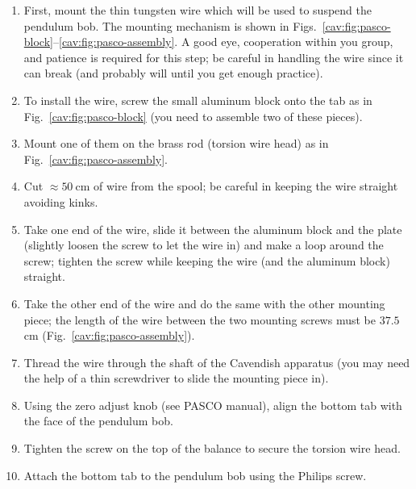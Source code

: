\begin{enumerate}
	\item First, mount the thin tungsten wire which will be used to suspend the
	pendulum bob. The mounting mechanism is shown in Figs.~\ref{cav:fig:pasco-block}--\ref{cav:fig:pasco-assembly}. A good eye,
	cooperation within you group, and patience is required for this step; be careful in
	handling the wire since it can break (and probably will until you get enough
	practice).
	
	\item To install the wire, screw the small aluminum block onto the tab as in Fig.~\ref{cav:fig:pasco-block} (you
	need to assemble two of these pieces).
	
	\item Mount one of them on the brass rod (torsion wire head) as in Fig.~\ref{cav:fig:pasco-assembly}.
	
	\item Cut $\approx 50\:$cm of wire from the spool; be careful in keeping the wire straight
	avoiding kinks.
	
	\item Take one end of the wire, slide it between the aluminum block and the plate
	(slightly loosen the screw to let the wire in) and make a loop around the screw;
	tighten the screw while keeping the wire (and the aluminum block) straight.
	
	\item Take the other end of the wire and do the same with the other mounting piece; the
	length of the wire between the two mounting screws must be $37.5\:$cm (Fig.~\ref{cav:fig:pasco-assembly}).
	
	\item Thread the wire through the shaft of the Cavendish apparatus (you may need the
	help of a thin screwdriver to slide the mounting piece in).
	
	\item Using the zero adjust knob (see PASCO manual), align the bottom tab with the
	face of the pendulum bob.
	
	\item Tighten the screw on the top of the balance to secure the torsion wire head.
	
	\item Attach the bottom tab to the pendulum bob using the Philips screw.

\end{enumerate}


